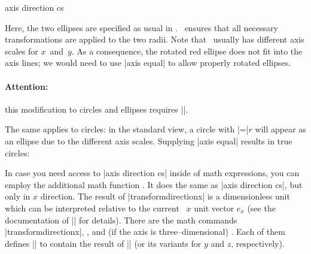 \begin{coordinatesystem}{axis direction cs}
\begin{codeexample}[]
\end{codeexample}
	Here, the two ellipses are specified as usual in \tikzname. \PGFPlots\ ensures that all necessary transformations are applied to the two radii. Note that \PGFPlots\ usually has different axis scales for $x$~and~$y$. As a consequence, the rotated red ellipse does not fit into the axis lines; we would need to use |axis equal| to allow properly rotated ellipses.

	\paragraph{Attention:} this modification to circles and ellipses requires |\pgfplotsset{compat=1.5.1}|.

	The same applies to circles: in the standard view, a circle with |=|$r$ will appear as an ellipse due to the different axis scales. Supplying |axis equal| results in true circles:
\begin{codeexample}[]
\end{codeexample}
\begin{codeexample}[]
\end{codeexample}

	In case you need access to |axis direction cs| inside of math expressions, you can employ the additional math function . It does the same as |axis direction cs|, but only in $x$ direction. The result of |transformdirectionx| is a dimensionless unit which can be interpreted relative to the current \pgfname\ $x$ unit vector $e_x$ (see the documentation of |\pgfplotstransformdirectionx| for details).
	There are the math commands |transformdirectionx|, , and (if the axis is three--dimensional) . Each of them defines |\pgfmathresult| to contain the result of |\pgfplotstransformdirectionx| (or its variants for $y$ and $z$, respectively).
	

\end{coordinatesystem}
